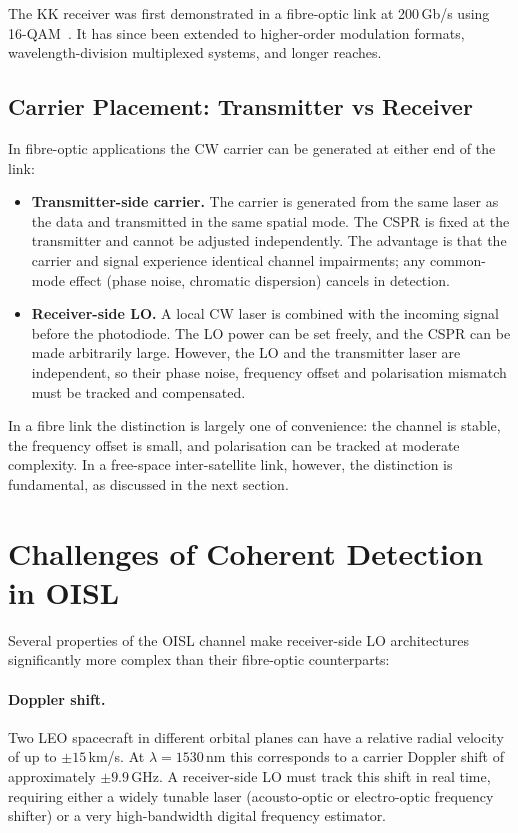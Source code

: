 The KK receiver was first demonstrated in a fibre-optic link at 200\,Gb/s using 16-QAM~\cite{mecozzi2016}. It has since been extended to higher-order modulation formats, wavelength-division multiplexed systems, and longer reaches.

\subsection{Carrier Placement: Transmitter vs Receiver}

In fibre-optic applications the CW carrier can be generated at either end of the link:
\begin{itemize}
\item \textbf{Transmitter-side carrier.} The carrier is generated from the same laser as the data and transmitted in the same spatial mode. The CSPR is fixed at the transmitter and cannot be adjusted independently. The advantage is that the carrier and signal experience identical channel impairments; any common-mode effect (phase noise, chromatic dispersion) cancels in detection.

\item \textbf{Receiver-side LO.} A local CW laser is combined with the incoming signal before the photodiode. The LO power can be set freely, and the CSPR can be made arbitrarily large. However, the LO and the transmitter laser are independent, so their phase noise, frequency offset and polarisation mismatch must be tracked and compensated.
\end{itemize}

In a fibre link the distinction is largely one of convenience: the channel is stable, the frequency offset is small, and polarisation can be tracked at moderate complexity. In a free-space inter-satellite link, however, the distinction is fundamental, as discussed in the next section.

\section{Challenges of Coherent Detection in OISL}

Several properties of the OISL channel make receiver-side LO architectures significantly more complex than their fibre-optic counterparts:

\paragraph{Doppler shift.} Two LEO spacecraft in different orbital planes can have a relative radial velocity of up to $\pm15$\,km/s. At $\lambda=1530$\,nm this corresponds to a carrier Doppler shift of approximately $\pm9.9$\,GHz. A receiver-side LO must track this shift in real time, requiring either a widely tunable laser (acousto-optic or electro-optic frequency shifter) or a very high-bandwidth digital frequency estimator.

